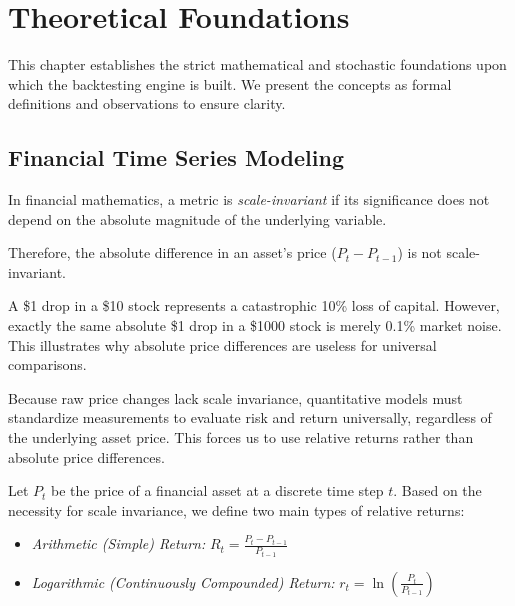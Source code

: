 \chapter{Theoretical Foundations}

This chapter establishes the strict mathematical and stochastic foundations upon which the backtesting engine is built. We present the concepts as formal definitions and observations to ensure clarity.

\section{Financial Time Series Modeling}

\begin{definition}
In financial mathematics, a metric is \textit{scale-invariant} if its significance does not depend on the absolute magnitude of the underlying variable.
\end{definition}
\begin{remark}
    Therefore, the absolute difference in an asset's price (\(P_t - P_{t-1}\)) is not scale-invariant.
\end{remark}
\begin{example}
A \$1 drop in a \$10 stock represents a catastrophic 10\% loss of capital. However, exactly the same absolute \$1 drop in a \$1000 stock is merely 0.1\% market noise. This illustrates why absolute price differences are useless for universal comparisons.
\end{example}

\begin{remark}
Because raw price changes lack scale invariance, quantitative models must standardize measurements to evaluate risk and return universally, regardless of the underlying asset price. This forces us to use relative returns rather than absolute price differences.
\end{remark}

\begin{definition}
Let \(P_t\) be the price of a financial asset at a discrete time step \(t\). Based on the necessity for scale invariance, we define two main types of relative returns:
\begin{itemize}
    \item \textit{Arithmetic (Simple) Return:} \(R_t = \frac{P_t - P_{t-1}}{P_{t-1}}\)
    \item \textit{Logarithmic (Continuously Compounded) Return:} \(r_t = \ln\left(\frac{P_t}{P_{t-1}}\right)\)
\end{itemize}
\end{definition}

